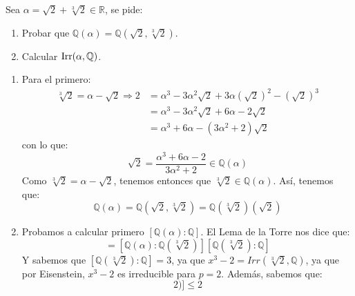 \begin{ejercicio}
    Sea $\alpha = \sqrt{2}+\sqrt[3]{2}\in \mathbb{R}$, se pide:
    \begin{enumerate}[label=\alph*)]
        \item Probar que $\mathbb{Q}(\alpha) = \mathbb{Q}(\sqrt{2},\sqrt[3]{2})$.
        \item Calcular $\operatorname{Irr}(\alpha,\mathbb{Q})$.
    \end{enumerate}
    \begin{enumerate}[label=\alph*)]
        \item Para el primero:
            \begin{align*}
                \sqrt[3]{2} = \alpha - \sqrt{2} \Longrightarrow 2&=\alpha^3 - 3\alpha^2\sqrt{2} + 3\alpha{(\sqrt{2})}^{2} - {(\sqrt{2})}^{3} \\
                                                &=\alpha^3 - 3\alpha^2\sqrt{2}+6\alpha - 2\sqrt{2} \\
                                                &=\alpha^3 + 6\alpha-(3\alpha^2 +2)\sqrt{2}
            \end{align*}
            con lo que:
            \begin{equation*}
                \sqrt{2} = \dfrac{\alpha^3 + 6\alpha - 2}{3\alpha^2 + 2}\in \mathbb{Q}(\alpha)
            \end{equation*}
            Como $\sqrt[3]{2} = \alpha-\sqrt{2}$, tenemos entonces que $\sqrt[3]{2}\in \mathbb{Q}(\alpha)$. Así, tenemos que:
            \begin{equation*}
                \mathbb{Q}(\alpha) = \mathbb{Q}(\sqrt{2},\sqrt[3]{2}) = \mathbb{Q}(\sqrt[3]{2})(\sqrt{2})
            \end{equation*}
        \item Probamos a calcular primero $[\mathbb{Q}(\alpha):\mathbb{Q}]$. El Lema de la Torre nos dice que:
            \begin{equation*}
                [\mathbb{Q}(\alpha):\mathbb{Q}] = [\mathbb{Q}(\alpha):\mathbb{Q}(\sqrt[3]{2})][\mathbb{Q}(\sqrt[3]{2}):\mathbb{Q}]
            \end{equation*}
            Y sabemos que $[\mathbb{Q}(\sqrt[3]{2}):\mathbb{Q}] =3$, ya que $x^3-2=Irr(\sqrt[3]{2},\mathbb{Q})$, ya que por Eisenstein, $x^3-2$ es irreducible para $p=2$. Además, sabemos que:
            \begin{equation*}
                [\mathbb{Q}(\alpha):\mathbb{Q}(\sqrt[3]{2})] \leq 2
            \end{equation*}

\end{enumerate}
\end{ejercicio}
